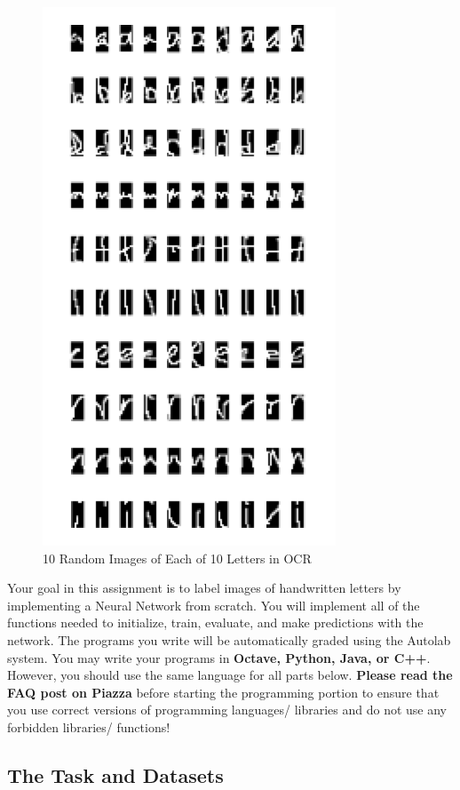 \documentclass[11pt]{article}
\numberwithin{equation}{section} %
\numberwithin{figure}{section} %
\numberwithin{table}{section} %
\begin{document}
\begin{figure}[H]
    \centering
    \includegraphics[scale=0.99]{img/10lettergrid.png}
    \caption{10 Random Images of Each of 10 Letters in OCR}
    \label{fig:grid}
\end{figure}

Your goal in this assignment is to label images of handwritten letters by implementing a Neural Network from scratch. You will implement all of the functions needed to initialize, train, evaluate, and make predictions with the network. 
%
The programs you write will be automatically graded using the Autolab system. You may write your programs in \textbf{Octave, Python, Java, or C++}. However, you should use the same language for all parts below. \textbf{Please read the FAQ post on Piazza} before starting the programming portion to ensure that you use correct versions of programming languages/ libraries and do not use any forbidden libraries/ functions!

\subsection{The Task and Datasets}
\label{sec:dataset}
\end{document}
